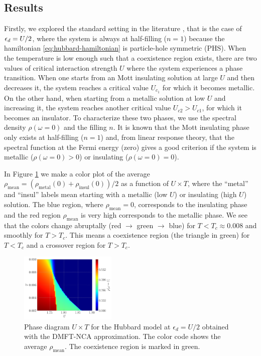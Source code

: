 \documentclass[12pt]{report}
\begin{document}
\subsection{Results} \label{sec:results}

Firstly, we explored the standard setting in the literature \cite{georges1996}, that is the case of $\epsilon_d = U/2$, where the system is always at half-filling ($n=1$) because the hamiltonian \ref{eq:hubbard-hamiltonian} is particle-hole symmetric (PHS). When the temperature is low enough such that a coexistence region exists, there are two values of critical interaction strength $U$ where the system experiences a phase transition. When one starts from an Mott insulating solution at large $U$ and then decreases it, the system reaches a critical value $U_{c_1}$ for which it becomes metallic. On the other hand, when starting from a metallic solution at low $U$ and increasing it, the system reaches another critical value $U_{c2} > U_{c1}$, for which it becomes an insulator. To characterize these two phases, we use the spectral density $\rho(\omega = 0)$ and the filling $n$. It is known that the Mott insulating phase only exists at half-filling ($n=1$) \cite{georges1996} and, from linear response theory, that the spectral function at the Fermi energy (zero) gives a good criterion if the system is metallic ($\rho(\omega=0) > 0$) or insulating ($\rho(\omega=0) = 0$).

In Figure \ref{fig:triangle-mu050} we make a color plot of the average $\rho_{\text{mean}} = (\rho_{\text{metal}}(0) + \rho_{\text{insul}}(0))/2$ as a function of $U \times T$, where the ``metal'' and ``insul'' labels mean starting with a metallic (low $U$) or insulating (high $U$) solution. The blue region, where $\rho_{\text{mean}} = 0$, corresponds to the insulating phase and the red region $\rho_{\text{mean}}$ is very high corresponds to the metallic phase. We see that the colors change abruptally (red $\to$ green $\to$ blue) for $T < T_c \approx 0.008$ and smoothly for $T > T_c$. This means a coexistence region (the triangle in green) for $T < T_c$ and a crossover region for $T > T_c$.

\begin{figure}[H]
\centering
\includegraphics[width=0.41\textwidth]{fig/dmft/triangle-w0-mu050.png}
\caption{Phase diagram  $U \times T$ for the Hubbard model at $\epsilon_d=U/2$ obtained with the DMFT-NCA approximation. The color code shows the average $\rho_{\text{mean}}$. The coexistence region is marked in green.}
\label{fig:triangle-mu050}
\end{figure}
\end{document}
